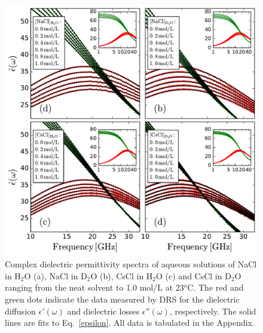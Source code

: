 \begin{figure}[t!]
	\centering
	\includegraphics[width=0.9\figwidth]{chapters/Chapter4_PRL/Graphs/RawPermittivity_AllSolutions.pdf}
	\caption{Complex dielectric permittivity spectra of aqueous solutions of NaCl in H$_2$O (a), NaCl in D$_2$O (b), CsCl in H$_2$O (c) and CsCl in D$_2$O ranging from the neat solvent to 1.0 mol/L at 23$^o$C. The red and green dots indicate the data measured by DRS for the dielectric diffusion $\epsilon'(\omega)$ and dielectric losses $\epsilon''(\omega)$, respectively. The solid lines are fits to Eq.~\ref{epsilon}. All data is tabulated in the Appendix.}
	\label{fig1_Chap4}
\end{figure}



